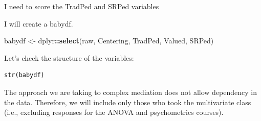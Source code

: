 \documentclass[
  11pt,
]{book}
\newenvironment{Shaded}{\begin{snugshade}}{\end{snugshade}}
\newcommand{\FloatTok}[1]{\textcolor[rgb]{0.06,0.06,0.06}{#1}}
\newcommand{\FunctionTok}[1]{\textcolor[rgb]{0.27,0.27,0.27}{\textbf{#1}}}
\newcommand{\NormalTok}[1]{#1}
\newcommand{\OtherTok}[1]{\textcolor[rgb]{0.37,0.37,0.37}{#1}}
\newcommand{\SpecialCharTok}[1]{\textcolor[rgb]{0.43,0.43,0.43}{\textbf{#1}}}
\newcommand{\StringTok}[1]{\textcolor[rgb]{0.5,0.5,0.5}{#1}}
\begin{document}
I need to score the TradPed and SRPed variables

\begin{Shaded}
\end{Shaded}

I will create a babydf.

\begin{Shaded}
\begin{Highlighting}[]
\NormalTok{babydf }\OtherTok{\textless{}{-}}\NormalTok{ dplyr}\SpecialCharTok{::}\FunctionTok{select}\NormalTok{(raw, Centering, TradPed, Valued, SRPed)}
\end{Highlighting}
\end{Shaded}

Let's check the structure of the variables:

\begin{verbatim}
str(babydf)
\end{verbatim}

The approach we are taking to complex mediation does not allow dependency in the data. Therefore, we will include only those who took the multivariate class (i.e., excluding responses for the ANOVA and psychometrics courses).
\end{document}
